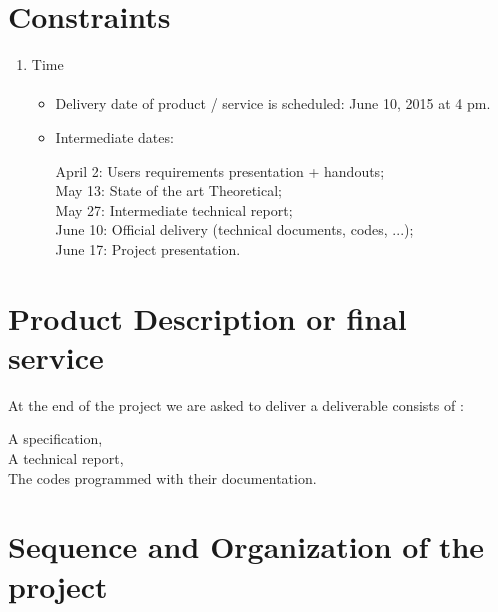 \section{Constraints}

\begin{enumerate}
	\item	Time\paragraph{}
	
	\begin{itemize}
		\item Delivery date of product / service is scheduled:  June 10, 2015 at 4 pm.
		\item Intermediate dates:
		\begin{flush-left}
			April 2: Users requirements presentation + handouts;\\
			May 13: State of the art Theoretical;\\
			May 27: Intermediate technical report;\\
			June 10: Official delivery (technical documents, codes, ...);\\
			June 17: Project presentation.\vspace*{0.5cm}
		\end{flush-left}
	\end{itemize}

\end{enumerate}



\section{ Product Description or final service}


At the end of the project we are asked to deliver a deliverable consists of :
\begin{center}
A specification,\\
A technical report,\\
The codes programmed with their documentation. \vspace*{0.5cm}
\end{center}



\section{Sequence and Organization of the project }

